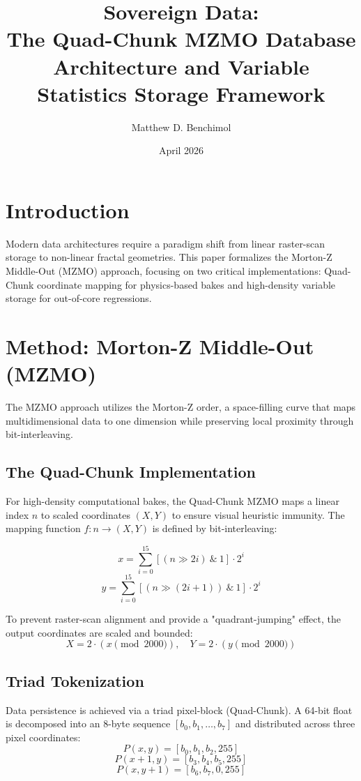 \documentclass[10pt,twocolumn]{article}
\title{\textbf{Sovereign Data: \\ The Quad-Chunk MZMO Database Architecture and Variable Statistics Storage Framework}}
\author{Matthew D. Benchimol}
\date{April 2026}
\begin{document}
\maketitle

\section{Introduction}
Modern data architectures require a paradigm shift from linear raster-scan storage to non-linear fractal geometries. This paper formalizes the Morton-Z Middle-Out (MZMO) approach, focusing on two critical implementations: Quad-Chunk coordinate mapping for physics-based bakes and high-density variable storage for out-of-core regressions.

\section{Method: Morton-Z Middle-Out (MZMO)}
The MZMO approach utilizes the Morton-Z order, a space-filling curve that maps multidimensional data to one dimension while preserving local proximity through bit-interleaving.

\subsection{The Quad-Chunk Implementation}
For high-density computational bakes, the Quad-Chunk MZMO maps a linear index $n$ to scaled coordinates $(X, Y)$ to ensure visual heuristic immunity. The mapping function $f: n \to (X, Y)$ is defined by bit-interleaving:

\begin{equation}
    x = \sum_{i=0}^{15} [ (n \gg 2i) \ \& \ 1 ] \cdot 2^i
\end{equation}
\begin{equation}
    y = \sum_{i=0}^{15} [ (n \gg (2i + 1)) \ \& \ 1 ] \cdot 2^i
\end{equation}

To prevent raster-scan alignment and provide a "quadrant-jumping" effect, the output coordinates are scaled and bounded:
\begin{equation}
    X = 2 \cdot (x \pmod{2000}), \quad Y = 2 \cdot (y \pmod{2000})
\end{equation}

\subsection{Triad Tokenization}
Data persistence is achieved via a triad pixel-block (Quad-Chunk). A 64-bit float is decomposed into an 8-byte sequence $[b_0, b_1, \dots, b_7]$ and distributed across three pixel coordinates:
\begin{equation}
    P(x, y) = [b_0, b_1, b_2, 255]
\end{equation}
\begin{equation}
    P(x+1, y) = [b_3, b_4, b_5, 255]
\end{equation}
\begin{equation}
    P(x, y+1) = [b_6, b_7, 0, 255]
\end{equation}
\end{document}
